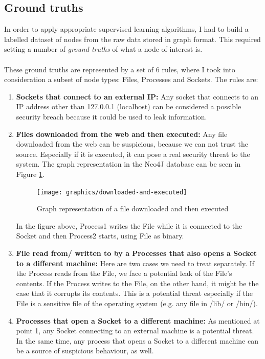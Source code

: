 	\subsection{Ground truths}
	In order to apply appropriate supervised learning algorithms, I had to build a labelled dataset of nodes from the raw data stored in graph format. This required setting a number of \textit{ground truths} of what a node of interest is. 
	\\ \\
	These ground truths are represented by a set of 6 rules, where I took into consideration a subset of node types: Files, Processes and Sockets. The rules are:
	\begin{enumerate}
		
		\item \textbf{Sockets that connect to an external IP: }Any socket that connects to an IP address other than 127.0.0.1 (localhost) can be considered a possible security breach because it could be used to leak information.
		
		\item \textbf{Files downloaded from the web and then executed: }Any file downloaded from the web can be suspicious, because we can not trust the source. Especially if it is executed, it can pose a real security threat to the system. The graph representation in the Neo4J database can be seen in Figure \ref{Figure 2.3}.
		\begin{figure}[H]
			\centering
			\texttt{[image: graphics/downloaded-and-executed]}
			\label{Figure 2.3}
			\caption{Graph representation of a file downloaded and then executed}
		\end{figure}
		In the figure above, Process1 writes the File while it is connected to the Socket and then Process2 starts, using File as binary.
		
		\item \textbf{File read from/ written to by a Processes that also opens a Socket to a different machine: }Here are two cases we need to treat separately. If the Process reads from the File, we face a potential leak of the File's contents. If the Process writes to the File, on the other hand, it might be the case that it corrupts its contents. This is a potential threat especially if the File is a sensitive file of the operating system (e.g. any file in /lib/ or /bin/). 
		
		\item \textbf{Processes that open a Socket to a different machine: }As mentioned at point 1, any Socket connecting to an external machine is a potential threat. In the same time, any process that opens a Socket to a different machine can be a source of suspicious behaviour, as well. 
		

\end{enumerate}
